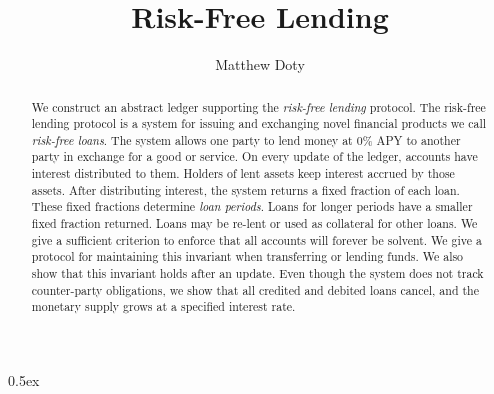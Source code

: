 \documentclass[11pt,a4paper]{article}
\begin{document}
\title{Risk-Free Lending}
\author{Matthew Doty}
\maketitle

\begin{abstract}
  We construct an abstract ledger supporting the \emph{risk-free
    lending} protocol. The risk-free lending protocol is a system for
  issuing and exchanging novel financial products we call
  \emph{risk-free loans}. The system allows one party to lend money at
  0\% APY to another party in exchange for a good or service. On every
  update of the ledger, accounts have interest distributed to them.
  Holders of lent assets keep interest accrued by those assets. After
  distributing interest, the system returns a fixed fraction of each
  loan. These fixed fractions determine \emph{loan periods}. Loans for
  longer periods have a smaller fixed fraction returned. Loans may be
  re-lent or used as collateral for other loans. We give a sufficient
  criterion to enforce that all accounts will forever be solvent. We
  give a protocol for maintaining this invariant when transferring or
  lending funds. We also show that this invariant holds after an
  update. Even though the system does not track counter-party
  obligations, we show that all credited and debited loans cancel, and
  the monetary supply grows at a specified interest rate.
\end{abstract}

\tableofcontents

\parindent 0pt\parskip 0.5ex



%
%
\end{document}
